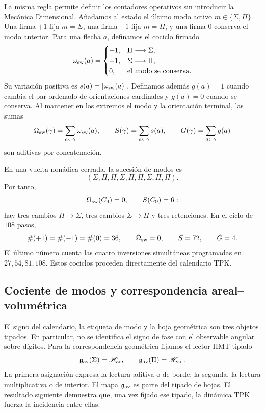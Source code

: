 La misma regla permite definir los contadores operativos sin introducir la
Mecánica Dimensional. Añadamos al estado el último modo activo
\(m\in\{\Sigma,\Pi\}\). Una firma \(+1\) fija \(m=\Sigma\), una firma
\(-1\) fija \(m=\Pi\), y una firma \(0\) conserva el modo anterior. Para una
flecha \(a\), definamos el cociclo firmado
\[
 \omega_{\rm sw}(a)=
 \begin{cases}
  +1,&\Pi\longrightarrow\Sigma,\\
  -1,&\Sigma\longrightarrow\Pi,\\
  0,&\text{el modo se conserva}.
 \end{cases}
\]
Su variación positiva es \(s(a)=|\omega_{\rm sw}(a)|\). Definamos además
\(g(a)=1\) cuando cambia el par ordenado de orientaciones cardinales y
\(g(a)=0\) cuando se conserva. Al mantener en los extremos el modo y la
orientación terminal, las sumas
\[
 \Omega_{\rm sw}(\gamma)=\sum_{a\subset\gamma}\omega_{\rm sw}(a),
 \qquad
 S(\gamma)=\sum_{a\subset\gamma}s(a),
 \qquad
 G(\gamma)=\sum_{a\subset\gamma}g(a)
\]
son aditivas por concatenación.

En una vuelta nonádica cerrada, la sucesión de modos es
\[
 (\Sigma,\Pi,\Pi,\Sigma,\Pi,\Pi,\Sigma,\Pi,\Pi).
\]
Por tanto,
\[
 \Omega_{\rm sw}(C_9)=0,\qquad S(C_9)=6:
\]
hay tres cambios \(\Pi\to\Sigma\), tres cambios
\(\Sigma\to\Pi\) y tres retenciones. En el ciclo de \(108\) pasos,
\[
 \#(+1)=\#(-1)=\#(0)=36,\qquad
 \Omega_{\rm sw}=0,\qquad S=72,\qquad G=4.
\]
El último número cuenta las cuatro inversiones simultáneas programadas en
\(27,54,81,108\). Estos cociclos proceden directamente del calendario TPK\@.

\subsection{Cociente de modos y correspondencia areal--volumétrica}
\label{sec:cociente-modos-fav}

El signo del calendario, la etiqueta de modo y la hoja geométrica son tres
objetos tipados. En particular, no se identifica el signo de fase con el
observable angular sobre dígitos. Para la correspondencia geométrica fijamos el
lector HMT tipado
\[
 \mathfrak g_{\rm av}(\Sigma)=\mathscr H_{\rm ar},
 \qquad
 \mathfrak g_{\rm av}(\Pi)=\mathscr H_{\rm vol}.
\]
La primera asignación expresa la lectura aditiva o de borde; la segunda, la
lectura multiplicativa o de interior. El mapa \(\mathfrak g_{\rm av}\) es
parte del tipado de hojas. El resultado siguiente demuestra que, una vez
fijado ese tipado, la dinámica TPK fuerza la incidencia entre ellas.

